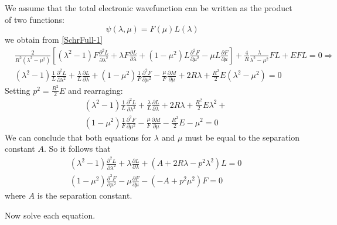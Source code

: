 We assume that the total electronic wavefunction can be written as the product of two functions:
\begin{equation}\label{variables2C}
\psi(\lambda,\mu) = F(\mu)L(\lambda)
\end{equation}
we obtain from \eqref{SchrFull-1}
\begin{equation}
\begin{split}
& \frac{2}{ R^2 (\lambda^2-\mu^2) }\left[(\lambda^2-1)F\frac{\partial^2 L}{\partial \lambda^2} + \lambda F\frac{\partial L}{\partial \lambda} + 
(1 - \mu^2)L\frac{\partial^2 F}{\partial \mu^2} - \mu L\frac{\partial F}{\partial \mu} \right] + \frac{4}{R}\frac{\lambda}{\lambda^2-\mu^2} F L + E F L = 0 \Rightarrow \\[.8em]
& (\lambda^2-1)\frac{1}{L}\frac{\partial^2 L}{\partial \lambda^2} + \frac{\lambda}{L}\frac{\partial L}{\partial \lambda} + 
(1 - \mu^2)\frac{1}{F}\frac{\partial^2 F}{\partial \mu^2} - \frac{\mu}{F} \frac{\partial M}{\partial \mu} + 2R\lambda + \frac{R^2}{2} E (\lambda^2 - \mu^2) = 0 
\end{split}
\end{equation}
Setting $ p^2 = \frac{R^2}{2}E $ and rearraging: \\[1.em]
\begin{equation}
\begin{split}
& (\lambda^2-1)\frac{1}{L}\frac{\partial^2 L}{\partial \lambda^2} + \frac{\lambda}{L}\frac{\partial L}{\partial \lambda} + 2R\lambda + \frac{R^2}{2} E \lambda^2 + \\[.8em]
& (1 - \mu^2)\frac{1}{F}\frac{\partial^2 F}{\partial \mu^2} - \frac{\mu}{F} \frac{\partial M}{\partial \mu} - \frac{R^2}{2} E - \mu^2 = 0
\end{split}
\end{equation}
We can conclude that both equations for $ \lambda $ and $ \mu $ must be equal to the separation constant $ A $. So it follows that
\begin{equation}\label{eqLG}
\begin{split}
& (\lambda^2-1)\frac{\partial^2 L}{\partial \lambda^2} + \lambda\frac{\partial L}{\partial \lambda} + \left(A + 2R\lambda - p^2 \lambda^2\right) L = 0 \\[.8em]
& (1 - \mu^2)\frac{\partial^2 F}{\partial \mu^2} - \mu\frac{\partial F}{\partial \mu} - \left(-A + p^2 \mu^2\right) F = 0
\end{split}
\end{equation}
where $ A $ is the separation constant.

Now solve each equation.

